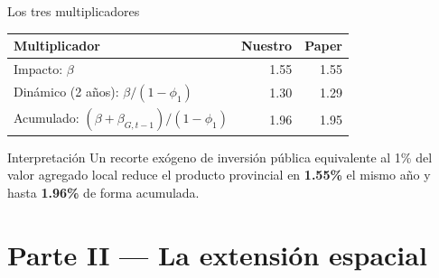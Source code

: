 \documentclass[
  10pt,
  ignorenonframetext,
  aspectratio=169,
  spanish,
]{beamer}
\begin{document}
\begin{frame}{Los tres multiplicadores}
\protect{}\label{los-tres-multiplicadores}
\begin{table}[!h]
\centering\begingroup\fontsize{9}{11}\selectfont

\begin{tabular}[t]{lrr}
\toprule
Multiplicador & Nuestro & Paper\\
\midrule
Impacto: $\beta$ & 1.55 & 1.55\\
Dinámico (2 años): $\beta/(1-\phi_1)$ & 1.30 & 1.29\\
Acumulado: $(\beta+\beta_{G,t-1})/(1-\phi_1)$ & 1.96 & 1.95\\
\bottomrule
\end{tabular}
\endgroup{}
\end{table}

\vspace{0.5cm}

\begin{alertblock}{Interpretación}
Un recorte exógeno de inversión pública equivalente al 1\% del valor agregado local reduce el producto provincial en \textbf{1.55\%} el mismo año y hasta \textbf{1.96\%} de forma acumulada.
\end{alertblock}
\end{frame}

\section{Parte II --- La extensión
espacial}\label{parte-ii-la-extensiuxf3n-espacial}
\end{document}
